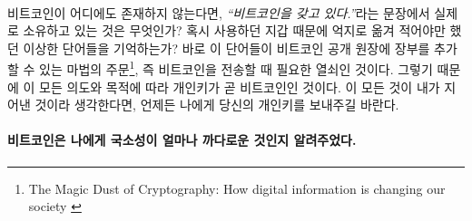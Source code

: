 \paragraph{}
비트코인이 어디에도 존재하지 않는다면, \textit{\enquote{비트코인을 갖고 있다.}}라는 문장에서 실제로 소유하고 있는 것은 무엇인가? 
혹시 사용하던 지갑 때문에 억지로 옮겨 적어야만 했던 이상한 단어들을 기억하는가?
바로 이 단어들이 비트코인 공개 원장에 장부를 추가할 수 있는 마법의 주문\footnote{The Magic Dust of Cryptography: How digital
	information is changing our society \cite{gigi:magic-spell}}, 즉 비트코인을 전송할 때 필요한 열쇠인 것이다. 
그렇기 때문에 이 모든 의도와 목적에 따라 개인키가 곧 비트코인인 것이다. 
이 모든 것이 내가 지어낸 것이라 생각한다면, 언제든 나에게 당신의 개인키를 보내주길 바란다.

\paragraph{비트코인은 나에게 국소성이 얼마나 까다로운 것인지 알려주었다.}

%
%
%
%
%
%
%

